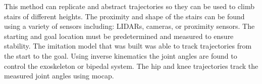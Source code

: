 This method can replicate and abstract trajectories so they can be used to climb stairs of different heights. The proximity and shape of the stairs can be found using a variety of sensors including: LIDARs, cameras, or proximity sensors. The starting and goal location must be predetermined and measured to ensure stability. The imitation model that was built was able to track trajectories from the start to the goal. Using inverse kinematics the joint angles are found to control the exoskeleton or bipedal system. The hip and knee trajectories track the measured joint angles using mocap. 


